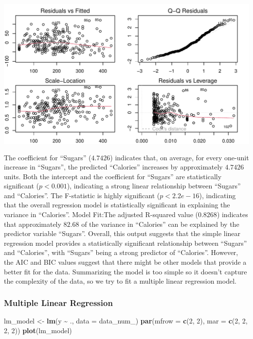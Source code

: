 \documentclass[
]{article}
\newenvironment{Shaded}{\begin{snugshade}}{\end{snugshade}}
\newcommand{\AttributeTok}[1]{\textcolor[rgb]{0.13,0.29,0.53}{#1}}
\newcommand{\DecValTok}[1]{\textcolor[rgb]{0.00,0.00,0.81}{#1}}
\newcommand{\FunctionTok}[1]{\textcolor[rgb]{0.13,0.29,0.53}{\textbf{#1}}}
\newcommand{\NormalTok}[1]{#1}
\newcommand{\OtherTok}[1]{\textcolor[rgb]{0.56,0.35,0.01}{#1}}
\newcommand{\SpecialCharTok}[1]{\textcolor[rgb]{0.81,0.36,0.00}{\textbf{#1}}}
\begin{document}
\begin{center}\includegraphics{Statistical_Learning_Final_Report_files/figure-latex/simple_linear_regression-1} \end{center}

The coefficient for ``Sugars'' (\(4.7426\)) indicates that, on average,
for every one-unit increase in ``Sugars'', the predicted ``Calories''
increases by approximately \(4.7426\) units. Both the intercept and the
coefficient for ``Sugars'' are statistically significant
(\(p < 0.001\)), indicating a strong linear relationship between
``Sugars'' and ``Calories''. The F-statistic is highly significant
(\(p < 2.2e-16\)), indicating that the overall regression model is
statistically significant in explaining the variance in ``Calories''.
Model Fit:The adjusted R-squared value (\(0.8268\)) indicates that
approximately \(82.68%
\) of the variance in ``Calories'' can be explained by the predictor
variable ``Sugars''. Overall, this output suggests that the simple
linear regression model provides a statistically significant
relationship between ``Sugars'' and ``Calories'', with ``Sugars'' being
a strong predictor of ``Calories''. However, the AIC and BIC values
suggest that there might be other models that provide a better fit for
the data. Summarizing the model is too simple so it doesn't capture the
complexity of the data, so we try to fit a multiple linear regression
model.

\hypertarget{multiple-linear-regression}{%
\subsubsection{Multiple Linear
Regression}\label{multiple-linear-regression}}

\begin{Shaded}
\begin{Highlighting}[]
\NormalTok{lm\_model }\OtherTok{\textless{}{-}} \FunctionTok{lm}\NormalTok{(y }\SpecialCharTok{\textasciitilde{}}\NormalTok{ ., }\AttributeTok{data =}\NormalTok{ data\_num\_)}
\FunctionTok{par}\NormalTok{(}\AttributeTok{mfrow =} \FunctionTok{c}\NormalTok{(}\DecValTok{2}\NormalTok{, }\DecValTok{2}\NormalTok{), }\AttributeTok{mar =} \FunctionTok{c}\NormalTok{(}\DecValTok{2}\NormalTok{, }\DecValTok{2}\NormalTok{, }\DecValTok{2}\NormalTok{, }\DecValTok{2}\NormalTok{))}
\FunctionTok{plot}\NormalTok{(lm\_model)}
\end{Highlighting}
\end{Shaded}
\end{document}
